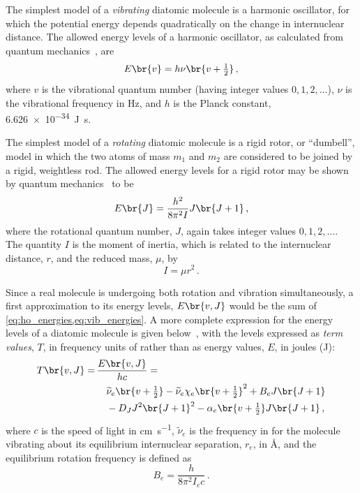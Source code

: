 The simplest model of a \emph{vibrating} diatomic molecule is a harmonic oscillator, for which the potential energy depends quadratically on the change in internuclear distance. 
The allowed energy levels of a harmonic oscillator, as calculated from quantum mechanics~\autocite{atkins94}, are
\begin{equation}
	E\br{v} = h \nu \br{v + \tfrac{1}{2}} \, ,
	\label{eq:ho_energies}
\end{equation}
where \( v \) is the vibrational quantum number (having integer values \( 0, 1, 2, \ldots \)), \( \nu \) is the vibrational frequency in \si{\Hz}, and \( h \) is the Planck constant, \SI{6.626e-34}{\J\s}. 

The simplest model of a \emph{rotating} diatomic molecule is a rigid rotor, or ``dumbell'', model in which the two atoms of mass \( m_1 \) and \( m_2 \) are considered to be joined by a rigid, weightless rod. 
The allowed energy levels for a rigid rotor may be shown by quantum mechanics~\autocite{atkins94} to be
\begin{equation}
	E\br{J} = \frac{h^2}{8 \pi^2 I} J \br{J + 1} \, ,
	\label{eq:vib_energies}
\end{equation}
where the rotational quantum number, \( J \), again takes integer values \( 0, 1, 2, \ldots \).
The quantity \( I \) is the moment of inertia, which is related to the internuclear distance, \( r \), and the reduced mass, \( \mu \), by
\begin{equation}
	I = \mu r^2 \, .
	\label{eq:mom_of_intert}
\end{equation}

Since a real molecule is undergoing both rotation and vibration simultaneously, a first approximation to its energy levels, \( E\br{v, J} \) would be the sum of \cref{eq:ho_energies,eq:vib_energies}. 
A more complete expression for the energy levels of a diatomic molecule is given below~\autocite{herzberg89,kerr82}, with the levels expressed as \emph{term values}, \( T \), in frequency units of \si{\wn} rather than as energy values, \( E \), in joules (\si{\J}):
\begin{equation}
	\begin{aligned}
	T\br{v, J} =\,& \frac{E\br{v, J}}{h c} = \\
		& \quad \widetilde{\nu}_e\br{v + \tfrac{1}{2}} - \widetilde{\nu}_e \chi_e\br{v + \tfrac{1}{2}}^2 + B_e J \br{J + 1} \\
			& \quad - D_J J^2 \br{J + 1}^2 - \alpha_e \br{v + \tfrac{1}{2}} J \br{J + 1} \, ,
	\end{aligned}
	\label{eq:vib_rot_energies}
\end{equation}
where \( c \) is the speed of light in \si{\cm \per \s}, \( \widetilde{\nu}_e \) is the frequency in \si{\wn} for the molecule vibrating about its equilibrium internuclear separation, \( r_e \), in \si{\angstrom}, and the equilibrium rotation frequency is defined as
\begin{equation}
	B_e = \frac{h}{8 \pi^2 I_e c} \, .
	\label{eq:b_e}
\end{equation}

